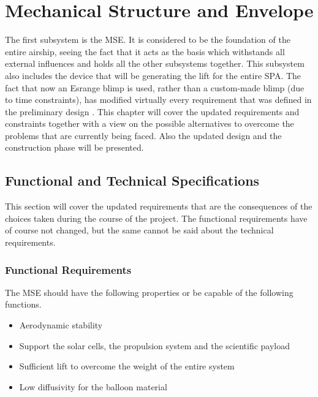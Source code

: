 \chapter{Mechanical Structure and Envelope}
\label{chap:mse}
%
The first subsystem is the \ac{MSE}. It is considered to be the foundation of the entire airship, seeing the fact that it acts as the basis which withstands all external influences and holds all the other subsystems together. This subsystem also includes the device that will be generating the lift for the entire \ac{SPA}. The fact that now an Esrange blimp is used, rather than a custom-made blimp (due to time constraints), has modified virtually every requirement that was defined in the preliminary design \cite{PDR}. This chapter will cover the updated requirements and constraints together with a view on the possible alternatives to overcome the problems that are currently being faced. Also the updated design and the construction phase will be presented. %
%
\section{Functional and Technical Specifications}
%
This section will cover the updated requirements that are the consequences of the choices taken during the course of the project. The functional requirements have of course not changed, but the same cannot be said about the technical requirements.
%
\subsection{Functional Requirements}
%
The \ac{MSE} should have the following properties or be capable of the following functions.
%
\begin{itemize}
\item Aerodynamic stability
\item Support the solar cells, the propulsion system and the scientific payload
\item Sufficient lift to overcome the weight of the entire system
\item Low diffusivity for the balloon material
\end{itemize}
%
